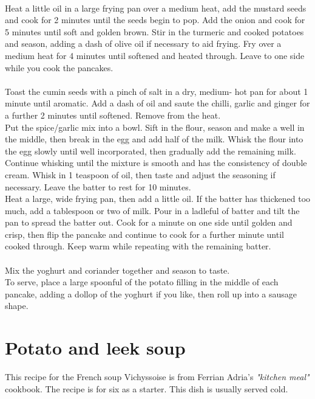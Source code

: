 \documentclass{tufte-book}
\begin{document}
\smallskip
{} 
\\Heat a little oil in a large frying pan over a medium heat, add the mustard seeds and cook for 2 minutes until the seeds begin to pop. Add the onion and cook for 5 minutes until soft and golden brown. Stir in the turmeric and cooked potatoes and season, adding a dash of olive oil if necessary to aid frying. Fry over a medium heat for 4 minutes until softened and heated through. Leave to one side while you cook the pancakes.
\\ 
\\Toast the cumin seeds with a pinch of salt in a dry, medium- hot pan for about 1 minute until aromatic. Add a dash of oil and saute the chilli, garlic and ginger for a further 2 minutes until softened. Remove from the heat.
\\Put the spice/garlic mix into a bowl. Sift in the flour, season and make a well in the middle, then break in the egg and add half of the milk. Whisk the flour into the egg slowly until well incorporated, then gradually add the remaining milk. Continue whisking until the mixture is smooth and has the consistency of double cream. Whisk in 1 teaspoon of oil, then taste and adjust the seasoning if necessary. Leave the batter to rest for 10 minutes.
\\Heat a large, wide frying pan, then add a little oil. If the batter has thickened too much, add a tablespoon or two of milk. Pour in a ladleful of batter and tilt the pan to spread the batter out. Cook for a minute on one side until golden and crisp, then flip the pancake and continue to cook for a further minute until cooked through. Keep warm while repeating with the remaining batter.
\\ 
\\Mix the yoghurt and coriander together and season to taste.
\\To serve, place a large spoonful of the potato filling in the middle of each pancake, adding a dollop of the yoghurt if you like, then roll up into a sausage shape.

\section{Potato and leek soup}

This recipe for the French soup Vichyssoise is from Ferrian Adria's \emph{"kitchen meal"} cookbook. The recipe is for six as a starter. This dish is usually served cold.
\end{document}
